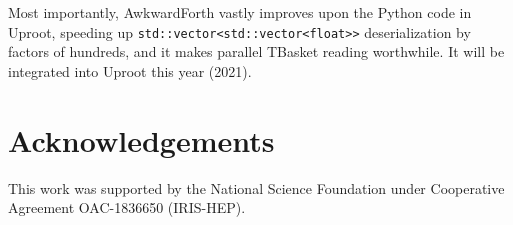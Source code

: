 \documentclass{webofc}
\begin{document}
Most importantly, AwkwardForth vastly improves upon the Python code in Uproot, speeding up \texttt{std::vector<std::vector<float>>} deserialization by factors of hundreds, and it makes parallel TBasket reading worthwhile. It will be integrated into Uproot this year (2021).

\section{Acknowledgements}

This work was supported by the National Science Foundation under Cooperative Agreement OAC-1836650 (IRIS-HEP).






\end{document}
